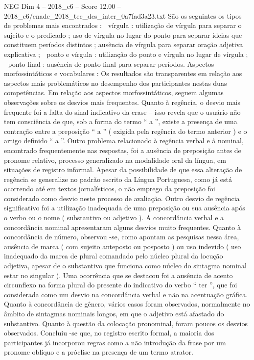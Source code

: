 \begin{textsample}{NEG Dim 4 – 2018\_c6 – Score 12.00 – 2018\_c6/enade\_2018\_tec\_des\_inter\_0a7fad3a23.txt}
São os seguintes os tipos de problemas mais encontrados :  vírgula : utilização de vírgula para separar o sujeito e o predicado ; uso de vírgula no lugar do ponto para separar ideias que constituem períodos distintos ; ausência de vírgula para separar oração adjetiva explicativa ;  ponto e vírgula : utilização do ponto e vírgula no lugar de vírgula ;  ponto final : ausência de ponto final para separar períodos.
Aspectos morfossintáticos e vocabulares : Os resultados são transparentes em relação aos aspectos mais problemáticos no desempenho dos participantes nestas duas competências.
Em relação aos aspectos morfossintáticos, seguem algumas observações sobre os desvios mais frequentes.
Quanto à regência, o desvio mais frequente foi a falta do sinal indicativo da crase – isso revela que o usuário não tem consciência de que, sob a forma do termo “ a ”, existe a presença de uma contração entre a preposição “ a ” ( exigida pela regência do termo anterior ) e o artigo definido “ a ”.
Outro problema relacionado à regência verbal e à nominal, encontrado frequentemente nas respostas, foi a ausência de preposição antes de pronome relativo, processo generalizado na modalidade oral da língua, em situações de registro informal.
Apesar da possibilidade de que essa alteração de regência se generalize no padrão escrito da Língua Portuguesa, como já está ocorrendo até em textos jornalísticos, o não emprego da preposição foi considerado como desvio neste processo de avaliação.
Outro desvio de regência significativo foi a utilização inadequada de uma preposição ou sua ausência após o verbo ou o nome ( substantivo ou adjetivo ).
A concordância verbal e a concordância nominal apresentaram alguns desvios muito frequentes.
Quanto à concordância de número, observou -se, como apontam as pesquisas nessa área, ausência de marca ( com sujeito anteposto ou posposto ) ou uso indevido ( uso inadequado da marca de plural comandado pelo núcleo plural da locução adjetiva, apesar de o substantivo que funciona como núcleo do sintagma nominal estar no singular ).
Uma ocorrência que se destacou foi a ausência de acento circunflexo na forma plural do presente do indicativo do verbo “ ter ”, que foi considerada como um desvio na concordância verbal e não na acentuação gráfica.
Quanto à concordância de gênero, vários casos foram observados, normalmente no âmbito de sintagmas nominais longos, em que o adjetivo está afastado do substantivo.
Quanto à questão da colocação pronominal, foram poucos os desvios observados.
Concluiu -se que, no registro escrito formal, a maioria dos participantes já incorporou regras como a não introdução da frase por um pronome oblíquo e a próclise na presença de um termo atrator.

\end{textsample}
